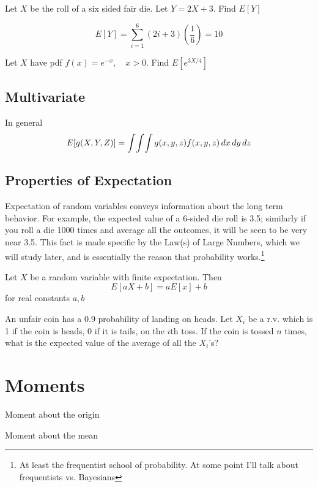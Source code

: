 \documentclass[../main.tex]{subfiles}
\begin{document}
\begin{example}
Let $X$ be the roll of a six sided fair die. Let $Y = 2X+3$. Find $E[Y]$
\end{example}
\begin{solution}
$$E[Y] = \sum_{i=1}^6 (2i+3)(\frac16) = 10$$
\end{solution}
\begin{example}
Let $X$ have pdf $f(x) = e^{-x}, \quad x>0$. Find $E[e^{3X/4}]$
\end{example}
\begin{solution}

\end{solution}
\subsection{Multivariate}
In general $$E[g(X,Y,Z)] = \int\!\int\!\int g(x,y,z) f(x,y,z) \,dx \,dy \,dz$$

\subsection{Properties of Expectation}
Expectation of random variables conveys information about the long term behavior. For example, the expected value of a 6-sided die roll is 3.5; similarly if you roll a die 1000 times and average all the outcomes, it will be seen to be very near 3.5. This fact is made specific by the Law(s) of Large Numbers, which we will study later, and is essentially the reason that probability works.\footnote{At 
least the frequentist school of probability. At some point I'll talk about frequentists vs. Bayesians}

\begin{theorem}
Let $X$ be a random variable with finite expectation. Then 
$$E[aX+b] = aE[x]+b$$
for real constants $a,b$
\end{theorem}
\begin{example}
    An unfair coin has a 0.9 probability of landing on heads. Let $X_i$ be a r.v. which is 1 if the coin is heads, 0 if it is tails, on the $i$th toss. If the coin is tossed $n$ times, what is the expected value of the average of all the $X_i$'s?
\end{example}

\section{Moments}
\begin{definition}Moment about the origin
\end{definition}
\begin{definition}Moment about the mean
\end{definition}
\end{document}
